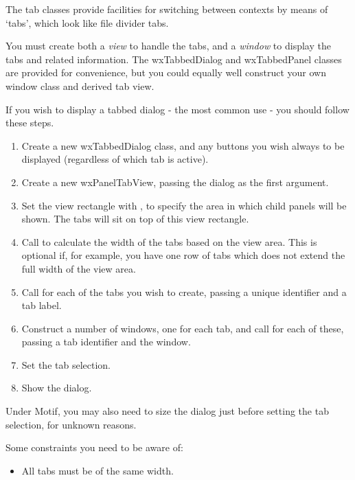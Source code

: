 
The tab classes provide facilities for switching between contexts by
means of `tabs', which look like file divider tabs.

You must create both a {\it view} to handle the tabs, and a {\it window} to display the tabs
and related information. The wxTabbedDialog and wxTabbedPanel classes are provided for
convenience, but you could equally well construct your own window class and derived
tab view.

If you wish to display a tabbed dialog - the most common use - you should follow these steps.

\begin{enumerate}\itemsep=0pt
\item Create a new wxTabbedDialog class, and any buttons you wish always to be displayed
(regardless of which tab is active).
\item Create a new wxPanelTabView, passing the dialog as the first argument.
\item Set the view rectangle with ,
to specify the area in which child panels will be
shown. The tabs will sit on top of this view rectangle.
\item Call  to calculate
the width of the tabs based on the view area. This is optional if, for example, you have one row
of tabs which does not extend the full width of the view area.
\item Call  for each of the tabs you wish to create, passing
a unique identifier and a tab label.
\item Construct a number of windows, one for each tab, and call  for
each of these, passing a tab identifier and the window.
\item Set the tab selection.
\item Show the dialog.
\end{enumerate}

Under Motif, you may also need to size the dialog just before setting the tab selection, for unknown reasons.

Some constraints you need to be aware of:

\begin{itemize}\itemsep=0pt
\item All tabs must be of the same width.
\item Omit the wxTAB\_STYLE\_COLOUR\_INTERIOR flag to ensure that the dialog background
and tab backgrounds match.
\end{itemize}

